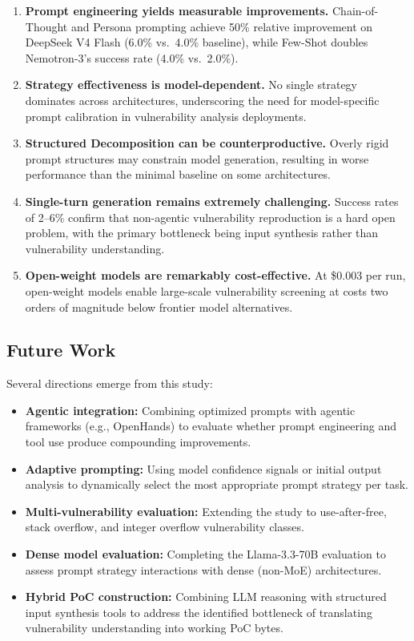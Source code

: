\documentclass{ieeeaccess}
\begin{document}
\begin{enumerate}
    \item \textbf{Prompt engineering yields measurable improvements.} Chain-of-Thought and Persona prompting achieve 50\% relative improvement on DeepSeek V4 Flash (6.0\% vs.\ 4.0\% baseline), while Few-Shot doubles Nemotron-3's success rate (4.0\% vs.\ 2.0\%).
    
    \item \textbf{Strategy effectiveness is model-dependent.} No single strategy dominates across architectures, underscoring the need for model-specific prompt calibration in vulnerability analysis deployments.
    
    \item \textbf{Structured Decomposition can be counterproductive.} Overly rigid prompt structures may constrain model generation, resulting in worse performance than the minimal baseline on some architectures.
    
    \item \textbf{Single-turn generation remains extremely challenging.} Success rates of 2--6\% confirm that non-agentic vulnerability reproduction is a hard open problem, with the primary bottleneck being input synthesis rather than vulnerability understanding.
    
    \item \textbf{Open-weight models are remarkably cost-effective.} At \$0.003 per run, open-weight models enable large-scale vulnerability screening at costs two orders of magnitude below frontier model alternatives.
\end{enumerate}

\subsection{Future Work}

Several directions emerge from this study:

\begin{itemize}
    \item \textbf{Agentic integration:} Combining optimized prompts with agentic frameworks (e.g., OpenHands) to evaluate whether prompt engineering and tool use produce compounding improvements.
    \item \textbf{Adaptive prompting:} Using model confidence signals or initial output analysis to dynamically select the most appropriate prompt strategy per task.
    \item \textbf{Multi-vulnerability evaluation:} Extending the study to use-after-free, stack overflow, and integer overflow vulnerability classes.
    \item \textbf{Dense model evaluation:} Completing the Llama-3.3-70B evaluation to assess prompt strategy interactions with dense (non-MoE) architectures.
    \item \textbf{Hybrid PoC construction:} Combining LLM reasoning with structured input synthesis tools to address the identified bottleneck of translating vulnerability understanding into working PoC bytes.
\end{itemize}
\end{document}
